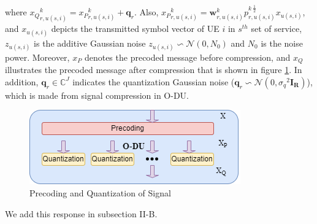 \documentclass[12pt, letterpaper]{article}
\begin{document}
where ${x_Q}^k_{r,u(s,i)} ={x_P}^k_{r,u(s,i)}+ \boldsymbol{q}_{r}$. Also, ${x_P}^k_{r,u(s,i)}= \boldsymbol{w}^k_{r,u(s,i)}{p^{k \: \frac{1}{2}}_{r,u(s,i)}} x_{u(s,i)} $, and  $ x_{u(s,i)}$ depicts the transmitted symbol vector of UE $i$ in $s^{th}$ set of service,  $z_{u(s,i)}$ is the additive Gaussian noise $z_{u(s,i)} \backsim \mathcal{N}(0,N_0)$ and $N_0$ is the noise power.
Moreover, ${x_P}$ denotes the precoded message before compression, and ${x_Q}$ illustrates the precoded message after compression that is shown in figure \ref{fig:pq}. 
In addition, $\boldsymbol{q}_{r} \in \mathbb{C}^{J }  $ indicates the quantization Gaussian noise 
($\boldsymbol{q}_{r} \backsim \mathcal{N}(0,{\sigma_q}^2\boldsymbol{I_{R}} )$), which is made from signal compression in O-DU.
\begin{figure}
  \centering 
  \captionsetup{justification=centering}
    \includegraphics[scale = 0.7]{Qdiag.png}
  \caption{Precoding and Quantization of Signal}
  \label{fig:pq}
\end{figure}

We add this response in subsection II-B.
\end{document}
